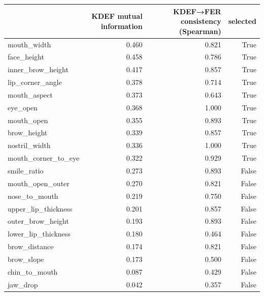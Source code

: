 \begin{tabular}{lrrr}
\toprule
 & KDEF mutual information & KDEF→FER consistency (Spearman) & selected \\
\midrule
mouth_width & 0.460 & 0.821 & True \\
face_height & 0.458 & 0.786 & True \\
inner_brow_height & 0.417 & 0.857 & True \\
lip_corner_angle & 0.378 & 0.714 & True \\
mouth_aspect & 0.373 & 0.643 & True \\
eye_open & 0.368 & 1.000 & True \\
mouth_open & 0.355 & 0.893 & True \\
brow_height & 0.339 & 0.857 & True \\
nostril_width & 0.336 & 1.000 & True \\
mouth_corner_to_eye & 0.322 & 0.929 & True \\
smile_ratio & 0.273 & 0.893 & False \\
mouth_open_outer & 0.270 & 0.821 & False \\
nose_to_mouth & 0.219 & 0.750 & False \\
upper_lip_thickness & 0.201 & 0.857 & False \\
outer_brow_height & 0.193 & 0.893 & False \\
lower_lip_thickness & 0.180 & 0.464 & False \\
brow_distance & 0.174 & 0.821 & False \\
brow_slope & 0.173 & 0.500 & False \\
chin_to_mouth & 0.087 & 0.429 & False \\
jaw_drop & 0.042 & 0.357 & False \\
\bottomrule
\end{tabular}
